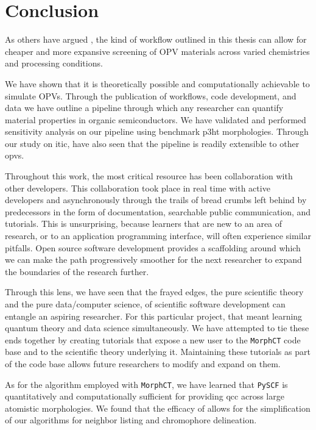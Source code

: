 \chapter{Conclusion}
\label{conclusion}

As others have argued \cite{Evans2016}\cite{Gali2017}\cite{Jones2017}, the kind of workflow outlined in this thesis
can allow for cheaper and more expansive screening of OPV materials across varied chemistries and processing
conditions. 

We have shown that it is theoretically possible and computationally
achievable to simulate OPVs. 
Through the publication
of workflows, code development, and data we have outline a 
pipeline through which any researcher can quantify material properties in
organic semiconductors. We have validated and performed sensitivity analysis on our pipeline using benchmark
\gls{p3ht} morphologies. Through our study on \gls{itic},  have also seen that the pipeline is readily
extensible to other \gls{opvs}.

Throughout this work, the most critical resource has been collaboration with
other developers. This collaboration took place in real time with active
developers and asynchronously through the trails of bread crumbs left behind
by predecessors in the form of documentation, searchable public communication,
and tutorials. This is unsurprising, because learners that are new to an area
of research, or to an application programming interface, will often experience
similar pitfalls. Open source software development provides a scaffolding
around which we can make the path progressively smoother for the next
researcher to expand the boundaries of the research further.

Through this lens, we have seen that the frayed edges, the pure
scientific theory and the pure data/computer science, of scientific software
development can entangle an aspiring researcher. For this particular project,
that meant learning quantum theory and data science simultaneously. We have
attempted to tie these ends together by creating tutorials that expose a new
user to the \texttt{MorphCT} code base and to the scientific theory
underlying it. Maintaining these tutorials as part of the code base allows
future researchers to modify and expand on them. 

As for the algorithm employed with \texttt{MorphCT}, we have learned that
\texttt{PySCF} is quantitatively and computationally sufficient for providing
\gls{qcc} across large atomistic morphologies. We found that the efficacy of
 allows for the simplification of our algorithms for neighbor
listing and chromophore delineation. 





